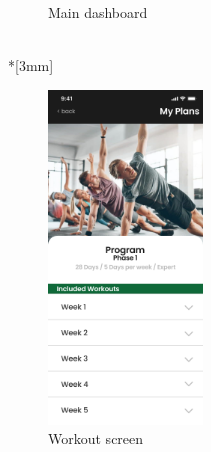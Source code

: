 \begin{figure}[H]
\begin{minipage}{0.5\textwidth}
\begin{subfigure}{\textwidth}
            \caption{Main dashboard}
            \label{fig:prototype-dashboard}
        \end{subfigure}
    \end{minipage}\\*[3mm]
    \centering
    \begin{minipage}{0.5\textwidth}
        \begin{subfigure}{\textwidth}
            \centering
            \includegraphics[width=0.45\textwidth]{graphics/prototype/workout-plan.png}
            \caption{Workout screen}
            \label{fig:prototype-workouts}
        \end{subfigure}
    \end{minipage}%
    \begin{minipage}{0.5\textwidth}
        \begin{subfigure}{\textwidth}
            \centering

\end{subfigure}
\end{minipage}
\end{figure}
